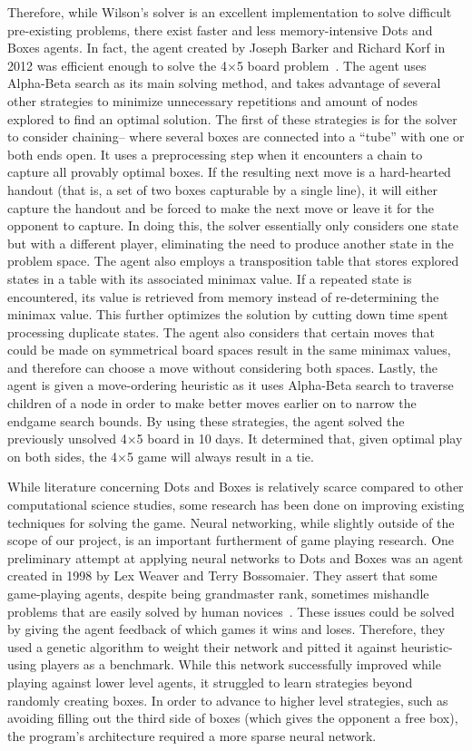 \documentclass[12pt]{article}
\begin{document}
    Therefore, while Wilson’s solver is an excellent implementation to solve difficult pre-existing problems, there exist faster and less memory-intensive Dots and Boxes agents. In fact, the agent created by Joseph Barker and Richard Korf in 2012 was efficient enough to solve the 4\(\times\)5 board problem~\cite{Barker_Korf_2012}. The agent uses Alpha-Beta search as its main solving method, and takes advantage of several other strategies to minimize unnecessary repetitions and amount of nodes explored to find an optimal solution. The first of these strategies is for the solver to consider chaining-- where several boxes are connected into a ``tube'' with one or both ends open. It uses a preprocessing step when it encounters a chain to capture all provably optimal boxes. If the resulting next move is a hard-hearted handout (that is, a set of two boxes capturable by a single line), it will either capture the handout and be forced to make the next move or leave it for the opponent to capture. In doing this, the solver essentially only considers one state but with a different player, eliminating the need to produce another state in the problem space. The agent also employs a transposition table that stores explored states in a table with its associated minimax value. If a repeated state is encountered, its value is retrieved from memory instead of re-determining the minimax value. This further optimizes the solution by cutting down time spent processing duplicate states. The agent also considers that certain moves that could be made on symmetrical board spaces result in the same minimax values, and therefore can choose a move without considering both spaces. Lastly, the agent is given a move-ordering heuristic as it uses Alpha-Beta search to traverse children of a node in order to make better moves earlier on to narrow the endgame search bounds. By using these strategies, the agent solved the previously unsolved 4\(\times\)5 board in 10 days. It determined that, given optimal play on both sides, the 4\(\times\)5 game will always result in a tie. 
    
    While literature concerning Dots and Boxes is relatively scarce compared to other computational science studies, some research has been done on improving existing techniques for solving the game. Neural networking, while slightly outside of the scope of our project, is an important furtherment of game playing research. One preliminary attempt at applying neural networks to Dots and Boxes was an agent created in 1998 by Lex Weaver and Terry Bossomaier. They assert that some game-playing agents, despite being grandmaster rank, sometimes mishandle problems that are easily solved by human novices~\cite{Cornell1998}. These issues could be solved by giving the agent feedback of which games it wins and loses. Therefore, they used a genetic algorithm to weight their network and pitted it against heuristic-using players as a benchmark. While this network successfully improved while playing against lower level agents, it struggled to learn strategies beyond randomly creating boxes. In order to advance to higher level strategies, such as avoiding filling out the third side of boxes (which gives the opponent a free box), the program’s architecture required a more sparse neural network.
    
\end{document}

